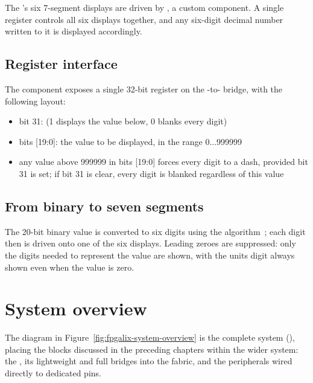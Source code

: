 \label{sec:fpgalix-hex-display}

The 's six 7-segment displays are driven by , a custom  component. A single register controls all six displays together, and any six-digit decimal number written to it is displayed accordingly.

\subsection{Register interface}
\label{sec:fpgalix-hex-register}

The component exposes a single 32-bit  register on the -to- bridge, with the following layout:

\begin{itemize}
    \item bit 31:  (1 displays the value below, 0 blanks every digit)
    \item bits [19:0]: the value to be displayed, in the range 0...999999
    \item any value above 999999 in bits [19:0] forces every digit to a dash, provided bit 31 is set; if bit 31 is clear, every digit is blanked regardless of this value
\end{itemize}

\subsection{From binary to seven segments}

The 20-bit binary value is converted to six  digits using the  algorithm~\cite{PEDRONI-VHDL}; each digit then is driven onto one of the six displays. Leading zeroes are suppressed: only the digits needed to represent the value are shown, with the units digit always shown even when the value is zero.

\section{System overview}
\label{sec:fpgalix-system-overview}

The diagram in Figure~\ref{fig:fpgalix-system-overview} is the complete  system (), placing the blocks discussed in the preceding chapters within the wider system: the , its lightweight and full bridges into the  fabric, and the  peripherals wired directly to dedicated  pins.

